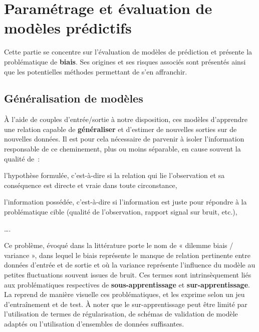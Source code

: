 \clearpage

\section{Paramétrage et évaluation de modèles prédictifs}
\label{sec:models_settings}
Cette partie se concentre sur l'évaluation de modèles de prédiction et présente la problématique de \textbf{biais}. Ses origines et ses risques associés sont présentés ainsi que les potentielles méthodes permettant de s'en affranchir.\par

\subsection{Généralisation de modèles}
\label{subsec:generalized_models}
À l'aide de couples d'entrée/sortie à notre disposition, ces modèles d’apprendre une relation capable de \textbf{généraliser} et d’estimer de nouvelles sorties sur de nouvelles données. Il est pour cela nécessaire de parvenir à isoler l'information responsable de ce cheminement, plus ou moins séparable, en cause souvent la qualité de~:
\begin{inlinerate}
    \item l'hypothèse formulée, c’est-à-dire si la relation qui lie l'observation et sa conséquence est directe et vraie dans toute circonstance,
    \item l'information possédée, c’est-à-dire si l'information est juste pour répondre à la problématique cible (qualité de l'observation, rapport signal sur bruit, etc.),
    \item \ldots.
\end{inlinerate}\par 

Ce problème, évoqué dans la littérature porte le nom de « dilemme biais / variance », dans lequel le biais représente le manque de relation pertinente entre données d’entrée et de sortie et où la variance représente l’influence du modèle au petites fluctuations souvent issues de bruit. Ces termes sont intrinsèquement liés aux problématiques respectives de \textbf{sous-apprentissage} et \textbf{sur-apprentissage}. La  reprend de manière visuelle ces problématiques, et les exprime selon un jeu d’entraînement et de test. À noter que le sur-apprentissage peut être limité par l’utilisation de termes de régularisation, de schémas de validation de modèle adaptés ou l’utilisation d’ensembles de données suffisantes.\par
 
